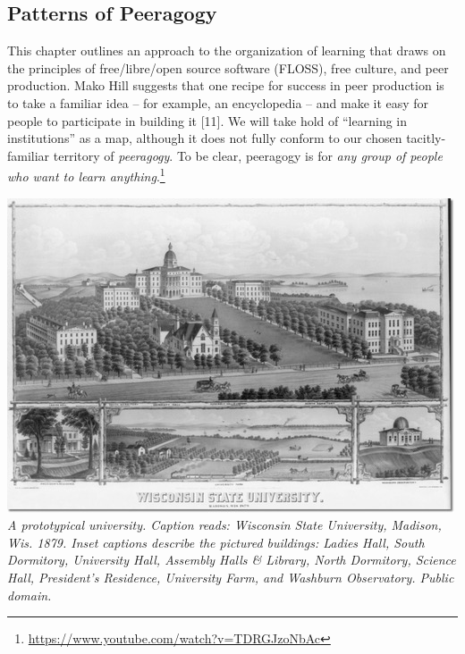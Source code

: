 \hypertarget{patterns-of-peeragogy}{%
\subsection{Patterns of Peeragogy}\label{patterns-of-peeragogy}}

This chapter outlines an approach to the organization of learning that
draws on the principles of free/libre/open source software (FLOSS), free
culture, and peer production. Mako Hill suggests that one recipe for
success in peer production is to take a familiar idea -- for example, an
encyclopedia -- and make it easy for people to participate in building
it {{[}11{]}}. We will take hold of ``learning in institutions'' as a
map, although it does not fully conform to our chosen tacitly-familiar
territory of \emph{peeragogy}. To be clear, peeragogy is for \emph{any
group of people who want to learn anything}.\footnote{\url{https://www.youtube.com/watch?v=TDRGJzoNbAc}}

\includegraphics{images/wisconsin-map.jpg}\\
\emph{A prototypical university. Caption reads: Wisconsin State
University, Madison, Wis. 1879. Inset captions describe the pictured
buildings: Ladies Hall, South Dormitory, University Hall, Assembly Halls
\& Library, North Dormitory, Science Hall, President's Residence,
University Farm, and Washburn Observatory. Public domain.}

